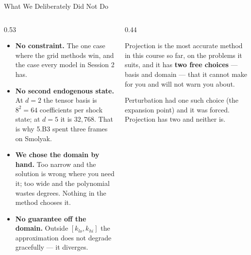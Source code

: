 \begin{frame}{What We Deliberately Did Not Do}
\begin{columns}[T]
\begin{column}{0.53\textwidth}
\small
\begin{itemize}\small
  \item \textbf{No constraint.} The one case where the grid methods win, and the case every model in Session 2 has.
  \item \textbf{No second endogenous state.} At $d=2$ the tensor basis is $8^{2}=64$ coefficients per shock state; at $d=5$ it is $32{,}768$. That is why 5.B3 spent three frames on Smolyak.
  \item \textbf{We chose the domain by hand.} Too narrow and the solution is wrong where you need it; too wide and the polynomial wastes degrees. Nothing in the method chooses it.
  \item \textbf{No guarantee off the domain.} Outside $[k_{lo},k_{hi}]$ the approximation does not degrade gracefully --- it diverges.
\end{itemize}
\end{column}
\begin{column}{0.44\textwidth}
\begin{cautionbox}[title=\textbf{The honest summary}]\small
Projection is the most accurate method in this course so far, on the problems it suits, and it has \textbf{two free choices} --- basis and domain --- that it cannot make for you and will not warn you about.
\end{cautionbox}
\medskip
\begin{examplebox}\footnotesize
Perturbation had one such choice (the expansion point) and it was forced. Projection has two and neither is.
\end{examplebox}
\end{column}
\end{columns}
\end{frame}

